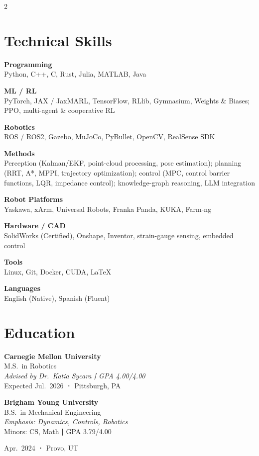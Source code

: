 \documentclass[letterpaper,10pt]{article}
\newcommand{\eduItem}[4]{
  \vspace{1pt}
  {\textbf{#1}}\\
  {\small #2}\\
  {\footnotesize\textit{#3}}\\
  {\footnotesize #4}
  \vspace{4pt}
}
\newcommand{\skillBlock}[2]{
  \vspace{2pt}
  {\small\textbf{#1}}\\
  {\small #2}
  \vspace{3pt}
}
\begin{document}
\begin{paracol}{2}


\section{Technical Skills}
\vspace{2pt}

\skillBlock{Programming}{Python, C++, C, Rust, Julia, MATLAB, Java}

\skillBlock{ML / RL}{PyTorch, JAX / JaxMARL, TensorFlow, RLlib, Gymnasium, Weights \& Biases; PPO, multi-agent \& cooperative RL}

\skillBlock{Robotics}{ROS / ROS2, Gazebo, MuJoCo, PyBullet, OpenCV, RealSense SDK}

\skillBlock{Methods}{Perception (Kalman/EKF, point-cloud processing, pose estimation); planning (RRT, A*, MPPI, trajectory optimization); control (MPC, control barrier functions, LQR, impedance control); knowledge-graph reasoning, LLM integration}

\skillBlock{Robot Platforms}{Yaskawa, xArm, Universal Robots, Franka Panda, KUKA, Farm-ng}

\skillBlock{Hardware / CAD}{SolidWorks (Certified), Onshape, Inventor, strain-gauge sensing, embedded control}

\skillBlock{Tools}{Linux, Git, Docker, CUDA, \LaTeX}

\skillBlock{Languages}{English (Native), Spanish (Fluent)}

\vspace{8pt}

\section{Education}
\vspace{4pt}

\eduItem{Carnegie Mellon University}
        {M.S.\ in Robotics}
        {Advised by Dr.\ Katia Sycara \textbf{|} GPA 4.00/4.00}
        {Expected Jul.\ 2026 \textbf{·} Pittsburgh, PA}

\eduItem{Brigham Young University}
        {B.S.\ in Mechanical Engineering}
        {Emphasis: Dynamics, Controls, Robotics}
        {Minors: CS, Math \textbf{|} GPA 3.79/4.00}

\vspace{1pt}
{\footnotesize Apr.\ 2024 \textbf{·} Provo, UT}


\end{paracol}
\end{document}
